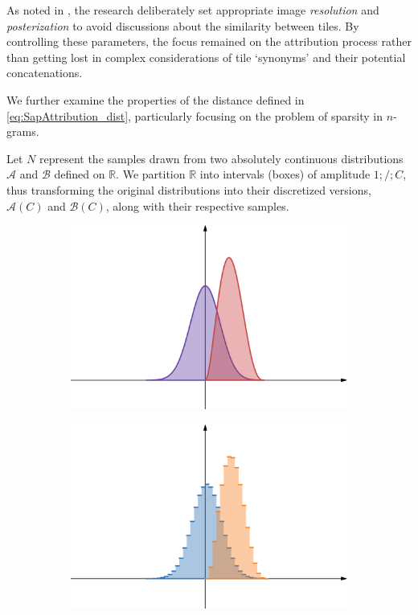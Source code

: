 \noindent As noted in \cite{thesis}, the research deliberately set appropriate image \textit{resolution} and \textit{posterization} to avoid discussions about the similarity between tiles. By controlling these parameters, the focus remained on the attribution process rather than getting lost in complex considerations of tile ‘synonyms’ and their potential concatenations.

\bigskip
We further examine the properties of the distance defined in  \cref{eq:SapAttribution_dist}, particularly focusing on the problem of sparsity in $n$-grams.

\noindent Let $N$ represent the samples drawn from two absolutely continuous distributions $\mathcal{A}$ and $\mathcal{B}$ defined on $\mathbb{R}$. We partition $\mathbb{R}$ into intervals (boxes) of amplitude $1;/;C$, thus transforming the original distributions into their discretized versions, $\mathcal{A}(C)$ and $\mathcal{B}(C)$, along with their respective samples.

\begin{figure}[ht]
	\centering
	\begin{subfigure}{0.45\linewidth}
		\includegraphics[width=\linewidth]{Figures/exnmodel_AB_cont.png}
	\end{subfigure} \begin{subfigure}{0.45\linewidth}
		\includegraphics[width=\linewidth]{Figures/exnmodel_AB_disc.png}
	\end{subfigure}
\end{figure}

